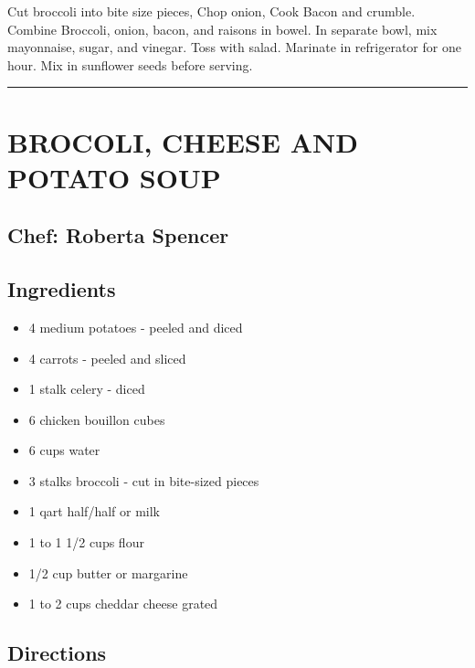 \documentclass[
]{book}
\providecommand{\tightlist}{%
  \setlength{\itemsep}{0pt}\setlength{\parskip}{0pt}}
\begin{document}
Cut broccoli into bite size pieces, Chop onion, Cook Bacon and crumble.
Combine Broccoli, onion, bacon, and raisons in bowel.
In separate bowl, mix mayonnaise, sugar, and vinegar. Toss with salad.
Marinate in refrigerator for one hour.
Mix in sunflower seeds before serving.

\begin{center}\rule{0.5\linewidth}{0.5pt}\end{center}

\hypertarget{brocoli-cheese-and-potato-soup}{%
\section*{BROCOLI, CHEESE AND POTATO SOUP}\label{brocoli-cheese-and-potato-soup}}


\hypertarget{chef-roberta-spencer-1}{%
\subsection*{Chef: Roberta Spencer}\label{chef-roberta-spencer-1}}


\hypertarget{ingredients-15}{%
\subsection*{Ingredients}\label{ingredients-15}}


\begin{itemize}
\tightlist
\item
  4 medium potatoes - peeled and diced
\item
  4 carrots - peeled and sliced
\item
  1 stalk celery - diced
\item
  6 chicken bouillon cubes
\item
  6 cups water
\item
  3 stalks broccoli - cut in bite-sized pieces
\item
  1 qart half/half or milk
\item
  1 to 1 1/2 cups flour
\item
  1/2 cup butter or margarine
\item
  1 to 2 cups cheddar cheese grated
\end{itemize}

\hypertarget{directions-15}{%
\subsection*{Directions}\label{directions-15}}
\end{document}
